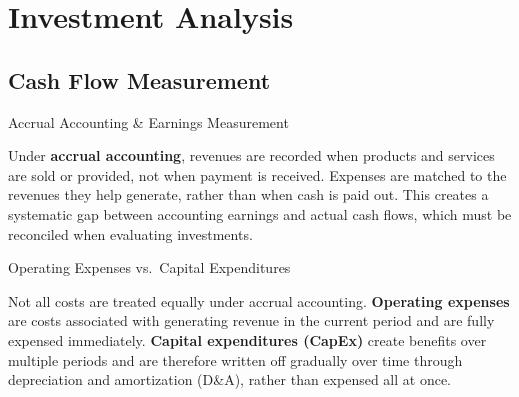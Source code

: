 \documentclass[10pt]{article}
\begin{document}
\section{Investment Analysis}

  \subsection{Cash Flow Measurement}

    \begin{core}{Accrual Accounting \& Earnings Measurement}

      Under \textbf{accrual accounting}, revenues are recorded when products and services are sold or provided, not when payment is received. Expenses are matched to the revenues they help generate, rather than when cash is paid out. This creates a systematic gap between accounting earnings and actual cash flows, which must be reconciled when evaluating investments.


    \end{core}

    \begin{core}{Operating Expenses vs.\ Capital Expenditures}

      Not all costs are treated equally under accrual accounting. \textbf{Operating expenses} are costs associated with generating revenue in the current period and are fully expensed immediately. \textbf{Capital expenditures (CapEx)} create benefits over multiple periods and are therefore written off gradually over time through depreciation and amortization (D\&A), rather than expensed all at once.


    \end{core}
\end{document}
